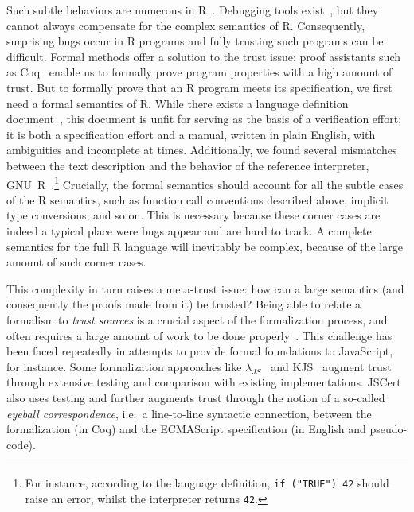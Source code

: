 \documentclass[
    sigplan,
    10pt,
    review, %
    natbib=false %
 ]{acmart}
\begin{document}
Such subtle behaviors are numerous in R~\parencite{RInferno}.
Debugging tools exist~\parencite{mcpherson2014},
but they cannot always compensate for the complex semantics of R.
Consequently, surprising bugs occur in R programs
and fully trusting such programs can be difficult.
%
Formal methods offer a solution to the trust issue:
proof assistants such as Coq~\parencite{Coq} enable us
to formally prove program properties with a high amount of trust.
But to formally prove that an R program meets its specification,
we first need a formal semantics of R.
While there exists a language definition document~\parencite{team2000r}, this document is unfit for serving as the basis of a verification effort; it is both a specification effort and a manual, written in plain English, with ambiguities and incomplete at times. Additionally, we found several mismatches between the text description and the behavior of the reference interpreter, GNU~R~\parencite{Rwebsite}.\footnote{For instance, according to the language definition, \texttt{if ("TRUE") 42} should raise an error, whilst the interpreter returns \texttt{42}.}
Crucially, the formal semantics should account for all the subtle cases of the R semantics, such as function call conventions described above, implicit type conversions, and so on.
This is necessary because these corner cases are indeed a typical place were bugs appear and are hard to track.
A complete semantics for the full R language will inevitably be complex,
because of the large amount of such corner cases.

This complexity in turn raises a meta-trust issue:
how can a large semantics (and consequently the proofs made from it)
be trusted? Being able to relate a formalism to {\em trust sources} is a crucial aspect of the formalization process, and often requires a large amount of work to be done properly~\parencite{leroy2014pip}. This challenge has been faced repeatedly in attempts to provide formal foundations to JavaScript, for instance.
%
Some formalization approaches like $\lambda_{JS}$~\cite{Guha2010} and KJS~\cite{kjs} augment trust through extensive testing and comparison with existing implementations. JSCert~\parencite{popl14jscert} also uses testing and further augments trust through the notion of a so-called {\em eyeball correspondence}, i.e.~a line-to-line syntactic connection, between the formalization (in Coq) and the ECMAScript specification (in English and pseudo-code).
\end{document}
